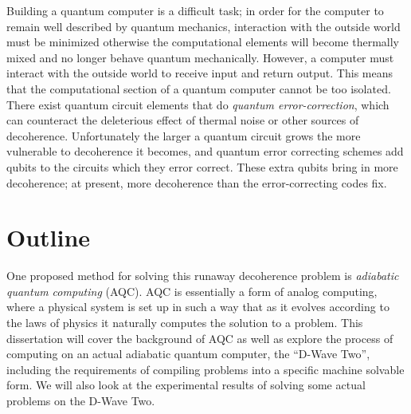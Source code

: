 Building a quantum computer is a difficult task;\cite{qc}\cite{qcbook} in order for the computer to remain well described by quantum mechanics, interaction with the outside world must be minimized otherwise the computational elements will become thermally mixed and no longer behave quantum mechanically.  However, a computer must interact with the outside world to receive input and return output.  This means that the computational section of a quantum computer cannot be too isolated.  There exist quantum circuit elements that do \emph{quantum error-correction},\cite{shor_error} which can counteract the deleterious effect of thermal noise or other sources of decoherence.  Unfortunately the larger a quantum circuit grows the more vulnerable to decoherence it becomes, and quantum error correcting schemes add qubits to the circuits which they error correct.  These extra qubits bring in more decoherence; at present, more decoherence than the error-correcting codes fix.

\section{Outline}
One proposed method for solving this runaway decoherence problem is \emph{adiabatic quantum computing} (AQC).\cite{farhi}  AQC is essentially a form of analog computing, where a physical system is set up in such a way that as it evolves according to the laws of physics it naturally computes the solution to a problem.  This dissertation will cover the background of AQC as well as explore the process of computing on an actual adiabatic quantum computer, the ``D-Wave Two'', including the requirements of compiling problems into a specific machine solvable form.  We will also look at the experimental results of solving some actual problems on the D-Wave Two.

